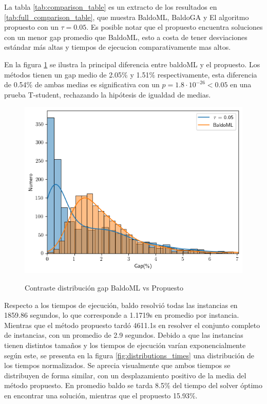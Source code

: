 \documentclass[spanish, a4paper, 12pt, openany,final]{book}
\begin{document}
La tabla \ref{tab:comparison_table} es un extracto de los resultados en \ref{tab:full_comparison_table}, que muestra BaldoML, BaldoGA y El algoritmo propuesto con un $\tau=0.05$. Es posible notar que el propuesto encuentra soluciones con un menor gap promedio que BaldoML, esto a costa de tener desviaciones estándar más altas y tiempos de ejecucion comparativamente mas altos.



En la figura \ref{fig:distributions} se ilustra la principal diferencia entre baldoML y el propuesto. Los métodos tienen un gap medio de 2.05\% y 1.51\% respectivamente, esta diferencia de 0.54\% de ambas medias es significativa con un $p = 1.8\cdot10^{-26} < 0.05$ en una prueba T-student, rechazando la hipótesis de igualdad de medias.

\begin{figure}[H]
	\includegraphics{graphs/distributions.png}	
	\label{fig:distributions}
	\caption{Contraste distribución gap BaldoML vs Propuesto}
\end{figure}

Respecto a los tiempos de ejecución, baldo resolvió todas las instancias en 1859.86 segundos, lo que corresponde a 1.1719s en promedio por instancia. Mientras que el método propuesto tardó 4611.1s en resolver el conjunto completo de instancias, con un promedio de 2.9 segundos. Debido a que las instancias tienen distintos tamaños y los tiempos de ejecución varían exponencialmente según este, se presenta en la figura \ref{fig:distributions_times} una distribución de los tiempos normalizados. Se aprecia visualmente que ambos tiempos se distribuyen de forma similar, con un desplazamiento positivo de la media del método propuesto. En promedio baldo se tarda 8.5\% del tiempo del solver óptimo en encontrar una solución, mientras que el propuesto 15.93\%.
\end{document}
